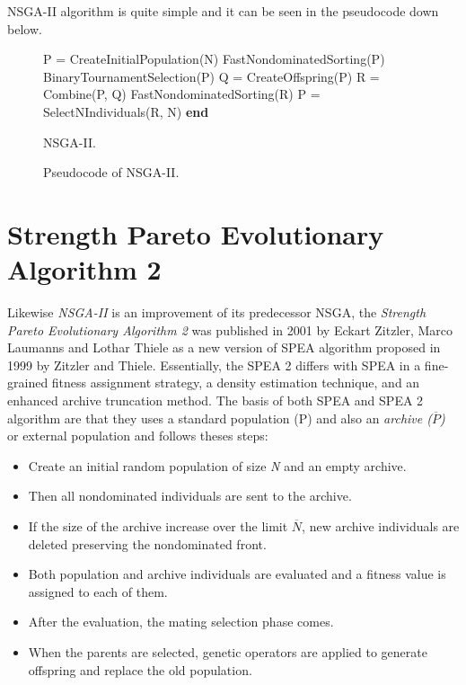 NSGA-II algorithm is quite simple and it can be seen in the pseudocode down below.

\begin{figure}
    \centering
\begin{algorithm}[H]
\begin{algorithmic}[1]
\State P = CreateInitialPopulation(N)\;
\State  FastNondominatedSorting(P)\;
    \State BinaryTournamentSelection(P)\;
    \State Q = CreateOffspring(P)\;
    \State R = Combine(P, Q)\;
    \State FastNondominatedSorting(R)\;
    \State P = SelectNIndividuals(R, N)\;
  \EndWhile
  \State \textbf{end}
\end{algorithmic}
\caption{NSGA-II.}
\end{algorithm}
\caption{Pseudocode of NSGA-II.}
\end{figure}
\section{Strength Pareto Evolutionary Algorithm 2}
Likewise \textit{NSGA-II} is an improvement of its predecessor NSGA, the \textit{Strength Pareto Evolutionary Algorithm 2} was published in 2001 by Eckart Zitzler, Marco Laumanns and Lothar Thiele as a new version of SPEA algorithm proposed in 1999 by Zitzler and Thiele\cite{SPEA2}. Essentially, the SPEA 2 differs with SPEA in a fine-grained fitness assignment strategy, a density estimation technique, and an enhanced archive truncation method\cite{SPEA2}.
The basis of both SPEA and SPEA 2 algorithm are that they uses a standard population (P) and also an \textit{archive ($\overline{P}$)} or external population and follows theses steps:
\begin{itemize}
    \item Create an initial random population of size \textit{N} and an empty archive.
    \item Then all nondominated individuals are sent to the archive.
    \item If the size of the archive increase over the limit $\overline{N}$, new archive individuals are deleted preserving the nondominated front.
    \item Both population and archive individuals are evaluated and a fitness value is assigned to each of them.
    \item After the evaluation, the mating selection phase comes.
    \item When the parents are selected, genetic operators are applied to generate offspring and replace the old population.
\end{itemize}

